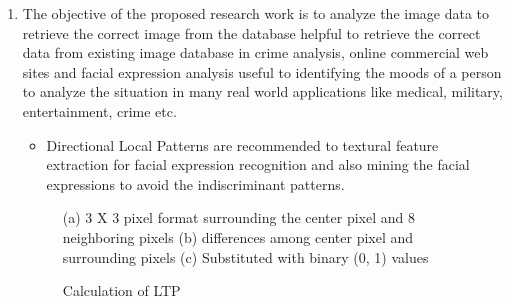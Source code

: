 \documentclass[review]{elsarticle}
\begin{document}
\begin{enumerate}
	\item The objective of the proposed research work is to analyze the image data to retrieve the correct image from the database helpful to retrieve the correct data from existing image database in crime analysis, online commercial web sites and facial expression analysis useful to identifying the moods of a person to analyze the situation in many real world applications like medical, military, entertainment, crime etc.
	\begin{itemize}
		\item  Directional Local Patterns are recommended to textural feature extraction for facial expression recognition and also mining the facial expressions to avoid the indiscriminant patterns.	
	\end{itemize}
	
	
	\begin{figure}
		\centering
		\caption{(a) 3 X 3 pixel format surrounding the center pixel and 8 neighboring pixels (b) differences among   center pixel and surrounding pixels (c) Substituted with binary (0, 1) values}
		\label{fig:fig1}
	\end{figure}
	
	\begin{figure}
		\centering
		\caption{Calculation of LTP}
		\label{fig:fig2}
	\end{figure}
	

\end{enumerate}
\end{document}

